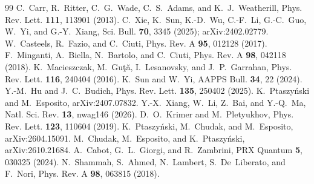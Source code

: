 \documentclass[aps,prl,twocolumn,superscriptaddress,amsmath,amssymb,reprint]{revtex4-2}
\begin{document}
\begin{thebibliography}{99}
 C.~Carr, R.~Ritter, C.~G.~Wade, C.~S.~Adams, and K.~J.~Weatherill, Phys. Rev. Lett. \textbf{111}, 113901 (2013).
 C.~Xie, K.~Sun, K.-D.~Wu, C.-F.~Li, G.-C.~Guo, W.~Yi, and G.-Y.~Xiang, Sci. Bull. \textbf{70}, 3345 (2025); arXiv:2402.02779.
 W.~Casteels, R.~Fazio, and C.~Ciuti, Phys. Rev. A \textbf{95}, 012128 (2017).
 F.~Minganti, A.~Biella, N.~Bartolo, and C.~Ciuti, Phys. Rev. A \textbf{98}, 042118 (2018).
 K.~Macieszczak, M.~Gu\c{t}\u{a}, I.~Lesanovsky, and J.~P.~Garrahan, Phys. Rev. Lett. \textbf{116}, 240404 (2016).
 K.~Sun and W.~Yi, AAPPS Bull. \textbf{34}, 22 (2024).
 Y.-M.~Hu and J.~C.~Budich, Phys. Rev. Lett. \textbf{135}, 250402 (2025).
 K.~Ptaszy\'nski and M.~Esposito, arXiv:2407.07832.
 Y.-X.~Xiang, W.~Li, Z.~Bai, and Y.-Q.~Ma, Natl. Sci. Rev. \textbf{13}, nwag146 (2026).
 D.~O.~Krimer and M.~Pletyukhov, Phys. Rev. Lett. \textbf{123}, 110604 (2019).
 K.~Ptaszy\'nski, M.~Chudak, and M.~Esposito, arXiv:2604.15091.
 M.~Chudak, M.~Esposito, and K.~Ptaszy\'nski, arXiv:2610.21684.
 A.~Cabot, G.~L.~Giorgi, and R.~Zambrini, PRX Quantum \textbf{5}, 030325 (2024).
 N.~Shammah, S.~Ahmed, N.~Lambert, S.~De~Liberato, and F.~Nori, Phys. Rev. A \textbf{98}, 063815 (2018).
\end{thebibliography}
\end{document}
